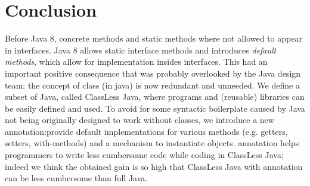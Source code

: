 \section{Conclusion}\label{sec:conclusion}

Before Java 8, concrete methods and static methods where not allowed
to appear in interfaces.  Java 8 allows static interface methods and
introduces \emph{default methods}, which allow for implementation
insides interfaces. This had an important positive consequence that
was probably overlooked by the Java design team: the concept of class
(in java) is now redundant and unneeded.  We define a subset of Java,
called ClassLess Java, where programs and (reusable) libraries can be
easily defined and used.  To avoid for some syntactic boilerplate
caused by Java not being originally designed to work without classes,
we introduce a new annotation:\mixin provide default implementations
for various methods (e.g. getters, setters, with-methods) and a
mechanism to instantiate objects. \mixin annotation helps programmers
to write less cumbersome code while coding in ClassLess Java; indeed
we think the obtained gain is so high that ClassLess Java with \mixin
annotation can be less cumbersome than full Java.
